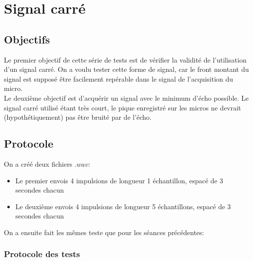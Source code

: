 \chapter{Signal carré}\label{signal_carre}
\section{Objectifs}
Le premier objectif de cette série de tests est de vérifier la validité de l'utilisation d'un signal carré.
On a voulu tester cette forme de signal, car le front montant du signal est supposé être facilement repérable dans le signal de l'acquisition du micro. \\
Le deuxième objectif est d'acquérir un signal avec le minimum d'écho possible. Le signal carré utilisé étant très court, le pique enregistré sur les micros ne devrait (hypothétiquement) pas être bruité par de l'écho.

\section{Protocole}\label{protocole}
On a créé deux fichiers $.wav$:
\begin{itemize}
\item Le premier envois 4 impulsions  de longueur 1 échantillon, espacé de 3 secondes chacun
\item Le deuxième envois 4 impulsions de longueur 5 échantillons, espacé de 3 secondes chacun
\end{itemize}
On a ensuite fait les mêmes teste que pour les séances précédentes:

\subsection{Protocole des tests}
 
